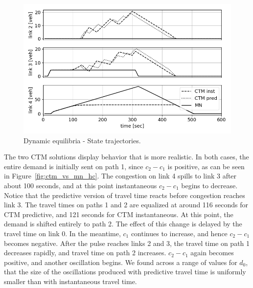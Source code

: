\begin{figure}[ht]
    \centering
    \includegraphics[width=0.9\linewidth]{figs/ctm_vs_mn_x.png}
    \caption{Dynamic equilibria - State trajectories.}
    \label{fig:ctm_vs_mn_x}
\end{figure}
The two CTM solutions display behavior that is more realistic. In both cases, the entire demand is initially sent on path 1, since $c_2-c_1$ is positive, as can be seen in Figure~\ref{fig:ctm_vs_mn_hc}. The congestion on link 4 spills to link 3 after about 100 seconds, and at this point instantaneous $c_2-c_1$ begins to decrease. Notice that the predictive version of travel time reacts before congestion reaches link 3. The travel times on paths 1 and 2 are equalized at around 116 seconds for CTM predictive, and 121 seconds for CTM instantaneous. At this point, the demand is shifted entirely to path 2. The effect of this change is delayed by the travel time on link 0. In the meantime, $c_1$ continues to increase, and hence $c_2-c_1$ becomes negative. After the pulse reaches links 2 and 3, the travel time on path 1 decreases rapidly, and travel time on path 2 increases. $c_2-c_1$ again becomes positive, and another oscillation begins. 
We found across a range of values for $d_0$, that the size of the oscillations produced with predictive travel time is uniformly smaller than with instantaneous travel time. 


